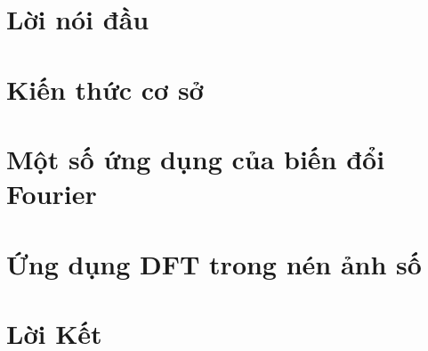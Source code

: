\documentclass[11pt,oneside,final]{ntu_qe}
\newcommand{\setdoublespace}{\dsp}
\newcommand*\NewPage{\newpage\null\thispagestyle{empty}\newpage}
\begin{document}
\setdoublespace


\hsp
\NewPage
%
\hsp
\chapter*{Lời nói đầu}\label{CH3}

\chapter{Kiến thức cơ sở}\label{CH1}

\chapter{Một số ứng dụng của biến đổi Fourier}\label{CH2}

\chapter{Ứng dụng DFT trong nén ảnh số}\label{CH3}

\chapter*{Lời Kết}\label{CH4}

%
%
\renewcommand{\bibname}{Tài liệu tham khảo}

\end{document}
